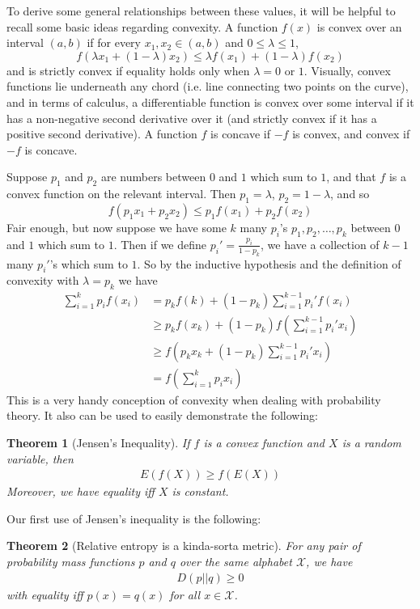 \documentclass{article}
\theoremstyle{definition}
\theoremstyle{plain}
\newtheorem{theorem}{Theorem}[section]
\begin{document}
To derive some general relationships between these values, it will be helpful to recall some basic ideas regarding convexity. A function $f(x)$ is convex over an interval $(a,b)$ if for every $x_1,x_2 \in (a,b)$ and $0 \leq \lambda \leq 1$, 
\[ f(\lambda x_1 + (1-\lambda)x_2) \leq \lambda f(x_1) + (1-\lambda)f(x_2) \]
and is strictly convex if equality holds only when $\lambda = 0$ or $1$. Visually, convex functions lie underneath any chord (i.e. line connecting two points on the curve), and in terms of calculus, a differentiable function is convex over some interval if it has a non-negative second derivative over it (and strictly convex if it has a positive second derivative). A function $f$ is concave if $-f$ is convex, and convex if $-f$ is concave. \par 
Suppose $p_1$ and $p_2$ are numbers between $0$ and $1$ which sum to $1$, and that $f$ is a convex function on the relevant interval. Then $p_1 = \lambda$, $p_2 = 1-\lambda$, and so 
\[ f(p_1x_1 + p_2x_2) \leq p_1f(x_1)+p_2f(x_2) \] 
Fair enough, but now suppose we have some $k$ many $p_i$'s $p_1,p_2,\ldots,p_k$ between $0$ and $1$ which sum to $1$. Then if we define $p_i' = \frac{p_i}{1-p_k}$, we have a collection of $k-1$ many $p_i'$'s which sum to $1$. So by the inductive hypothesis and the definition of convexity with $\lambda = p_k$ we have
\begin{align*}
	\sum_{i=1}^k p_if(x_i) &= p_kf(k)+(1-p_k)\sum_{i=1}^{k-1}p_i'f(x_i) \\
		&\geq p_kf(x_k)+(1-p_k)f\left( \sum_{i=1}^{k-1} p_i'x_i \right) \\
		&\geq f\left( p_kx_k+(1-p_k)\sum_{i=1}^{k-1}p_i'x_i \right) \\
		&= f\left( \sum_{i=1}^k p_ix_i \right)
\end{align*} 
This is a very handy conception of convexity when dealing with probability theory. It also can be used to easily demonstrate the following:
\begin{theorem}[Jensen's Inequality]
	If $f$ is a convex function and $X$ is a random variable, then 
\begin{align}
	E(f(X)) \geq f(E(X))
\end{align}
Moreover, we have equality iff $X$ is constant.
\end{theorem}
Our first use of Jensen's inequality is the following:
\begin{theorem}[Relative entropy is a kinda-sorta metric]
	For any pair of probability mass functions $p$ and $q$ over the same alphabet $\mathcal{X}$, we have
	\begin{align}
		D(p||q) \geq 0
	\end{align}
with equality iff $p(x) = q(x)$ for all $x \in \mathcal{X}$. 
\end{theorem}
\end{document}
